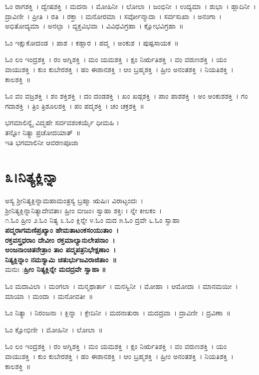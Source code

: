 ಓಂ ರಾಗಶಕ್ತಿ~।  ದ್ವೇಷಶಕ್ತಿ~।  ಮದನಾ~।  ಮೋಹಿನೀ~।  ಲೋಲಾ~।  ಜಂಭಿನೀ~।  ಉದ್ಯಮಾ~।  ಶುಭಾ~।  ಹ್ಲಾದಿನೀ~।  ದ್ರಾವಿಣೀ~।  ಪ್ರೀತಿ~।  ರತಿ~।  ರಕ್ತಾ~।  ಮನೋರಮಾ~।  ಸರ್ವೋನ್ಮಾದಾ~।  ಸರ್ವಸುಖಾ~।  ಅನಂಗಾ~।  ಅಭಿತೋದ್ಯಮಾ~। ಅನಲ್ಪಾ~।  ವ್ಯಕ್ತವಿಭವಾ~।  ವಿವಿಧವಿಗ್ರಹಾ~।  ಕ್ಷೋಭವಿಗ್ರಹಾ~॥ 

ಓಂ ಇಕ್ಷುಕೋದಂಡ~।  ಪಾಶ~।  ಕಹ್ಲಾರ~।  ಪದ್ಮ~।  ಅಂಕುಶ~।  ಪುಷ್ಪಸಾಯಕ~॥ 

ಓಂ ಲಂ ಇಂದ್ರಶಕ್ತಿ~।  ರಂ ಅಗ್ನಿಶಕ್ತಿ~।  ಮಂ ಯಮಶಕ್ತಿ~।  ಕ್ಷಂ ನಿರ್ಋತಿಶಕ್ತಿ~।  ವಂ ವರುಣಶಕ್ತಿ~।  ಯಂ ವಾಯುಶಕ್ತಿ~।  ಕುಂ ಕುಬೇರಶಕ್ತಿ~।  ಹಂ ಈಶಾನಶಕ್ತಿ~।  ಆಂ ಬ್ರಹ್ಮಶಕ್ತಿ~।  ಹ್ರೀಂ ಅನಂತಶಕ್ತಿ~।  ನಿಯತಿಶಕ್ತಿ~।  ಕಾಲಶಕ್ತಿ~॥ 

ಓಂ ವಂ ವಜ್ರಶಕ್ತಿ~।  ಶಂ ಶಕ್ತಿಶಕ್ತಿ~।  ದಂ ದಂಡಶಕ್ತಿ~।  ಖಂ ಖಡ್ಗಶಕ್ತಿ~।  ಪಾಂ ಪಾಶಶಕ್ತಿ~।  ಅಂ ಅಂಕುಶಶಕ್ತಿ~।  ಗಂ ಗದಾಶಕ್ತಿ~।  ತ್ರಿಂ ತ್ರಿಶೂಲಶಕ್ತಿ~।  ಪಂ ಪದ್ಮಶಕ್ತಿ~।  ಚಂ ಚಕ್ರಶಕ್ತಿ~॥ 

ಭಗಮಾಲಿನ್ಯೈ ವಿದ್ಮಹೇ ಸರ್ವವಶಂಕರ್ಯೈ ಧೀಮಹಿ ।\\ತನ್ನೋ ನಿತ್ಯಾ ಪ್ರಚೋದಯಾತ್~॥\\
ಇತಿ ಭಗಮಾಲಿನೀ ಆವರಣಪೂಜಾ
\section{೩।ನಿತ್ಯಕ್ಲಿನ್ನಾ}
ಅಸ್ಯ ಶ್ರೀನಿತ್ಯಕ್ಲಿನ್ನಾಮಹಾಮಂತ್ರಸ್ಯ ಬ್ರಹ್ಮಾ ಋಷಿಃ। ವಿರಾಟ್ಛಂದಃ~।\\ ಶ್ರೀನಿತ್ಯಕ್ಲಿನ್ನಾನಿತ್ಯಾದೇವತಾ। ಹ್ರೀಂ ಬೀಜಂ। ಸ್ವಾಹಾ ಶಕ್ತಿಃ । ನ್ನೇ ಕೀಲಕಂ~।\\
೧.ಓಂ ಹ್ರೀಂ ೨.ಓಂ ನಿತ್ಯ  ೩.ಓಂ ಕ್ಲಿನ್ನೇ ೪.ಓಂ ಮದ ೫.ಓಂ ದ್ರವೇ ೬.ಓಂ ಸ್ವಾಹಾ\\
{\bfseries ಪದ್ಮರಾಗಮಣಿಪ್ರಖ್ಯಾಂ ಹೇಮತಾಟಂಕಸಂಯುತಾಂ~।\\
ರಕ್ತವಸ್ತ್ರಧರಾಂ ದೇವೀಂ ರಕ್ತಮಾಲ್ಯಾನುಲೇಪನಾಂ~।\\
ಅಂಜನಾಂಚಿತನೇತ್ರಾಂ ತಾಂ ಪದ್ಮಪತ್ರನಿಭೇಕ್ಷಣಾಂ~।\\
ನಿತ್ಯಕ್ಲಿನ್ನಾಂ ನಮಸ್ಯಾಮಿ ಚತುರ್ಭುಜವಿರಾಜಿತಾಂ~॥\\}
ಮನುಃ :{\bfseries  ಹ್ರೀಂ ನಿತ್ಯಕ್ಲಿನ್ನೇ ಮದದ್ರವೇ ಸ್ವಾಹಾ ॥}

ಓಂ ಮದಾವಿಲಾ~।  ಮಂಗಲಾ~।  ಮನ್ಮಥಾರ್ತಾ~।  ಮನಸ್ವಿನೀ~।  ಮೋಹಾ~।  ಆಮೋದಾ~।  ಮಾನಮಯೀ~।  ಮಾಯಾ~।  ಮಂದಾ~।  ಮನೋವತೀ~॥ 

ಓಂ ನಿತ್ಯಾ~।  ನಿರಂಜನಾ~।  ಕ್ಲಿನ್ನಾ~।  ಕ್ಲೇದಿನೀ~।  ಮದನಾತುರಾ~।  ಮದದ್ರವಾ~।  ದ್ರಾವಿಣೀ~।  ದ್ರವಿಣಾ~॥ 

ಓಂ ಕ್ಷೋಭಿಣೀ~।  ಮೋಹಿನೀ~।  ಲೋಲಾ~॥

ಓಂ ಲಂ ಇಂದ್ರಶಕ್ತಿ~।  ರಂ ಅಗ್ನಿಶಕ್ತಿ~।  ಮಂ ಯಮಶಕ್ತಿ~।  ಕ್ಷಂ ನಿರ್ಋತಿಶಕ್ತಿ~।  ವಂ ವರುಣಶಕ್ತಿ~।  ಯಂ ವಾಯುಶಕ್ತಿ~।  ಕುಂ ಕುಬೇರಶಕ್ತಿ~।  ಹಂ ಈಶಾನಶಕ್ತಿ~।  ಆಂ ಬ್ರಹ್ಮಶಕ್ತಿ~।  ಹ್ರೀಂ ಅನಂತಶಕ್ತಿ~।  ನಿಯತಿಶಕ್ತಿ~।  ಕಾಲಶಕ್ತಿ~॥ 

